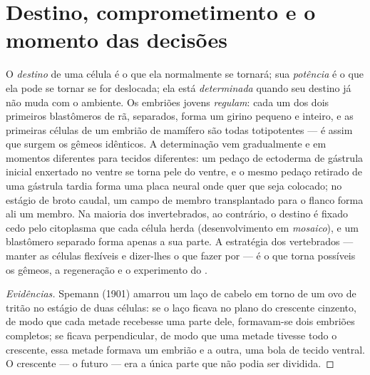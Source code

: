 \section{Destino, comprometimento e o momento das decisões}

\begin{proposition}\label{prop:b2:vertebrate-development:commitment}
O \emph{destino} de uma célula é o que ela normalmente se tornará; sua
\emph{potência} é o que ela pode se tornar se for deslocada; ela está
\emph{determinada} quando seu destino já não muda com o ambiente. Os
embriões jovens \emph{regulam}: cada um dos dois primeiros blastômeros
de rã, separados, forma um girino pequeno e inteiro, e as primeiras
células de um embrião de mamífero são todas totipotentes --- é assim
que surgem os gêmeos idênticos. A determinação vem gradualmente e em
momentos diferentes para tecidos diferentes: um pedaço de ectoderma de
gástrula inicial enxertado no ventre se torna pele do ventre, e o mesmo
pedaço retirado de uma gástrula tardia forma uma placa neural onde quer
que seja colocado; no estágio de broto caudal, um campo de membro
transplantado para o flanco forma ali um membro. Na maioria dos
invertebrados, ao contrário, o destino é fixado cedo pelo citoplasma
que cada célula herda (desenvolvimento em \emph{mosaico}), e um
blastômero separado forma apenas a sua parte. A estratégia dos
vertebrados --- manter as células flexíveis e dizer-lhes o que fazer por
 --- é o que torna possíveis os gêmeos, a regeneração e o
experimento do .
\end{proposition}
\begin{proof}[Evidências]
Spemann (1901) amarrou um laço de cabelo em torno de um ovo de tritão
no estágio de duas células: se o laço ficava no plano do crescente
cinzento, de modo que cada metade recebesse uma parte dele, formavam-se
dois embriões completos; se ficava perpendicular, de modo que uma
metade tivesse todo o crescente, essa metade formava um embrião e a
outra, uma bola de tecido ventral. O crescente --- o futuro 
--- era a única parte que não podia ser dividida.
\end{proof}

